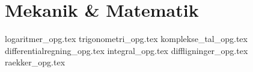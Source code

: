 \documentclass[crop=false, class=memoir]{standalone}
\begin{document}
\section{Mekanik \& Matematik}

{logaritmer_opg.tex}
{trigonometri_opg.tex}
{komplekse_tal_opg.tex}
{differentialregning_opg.tex}
{integral_opg.tex}
{diffligninger_opg.tex}
{raekker_opg.tex}
\end{document}
